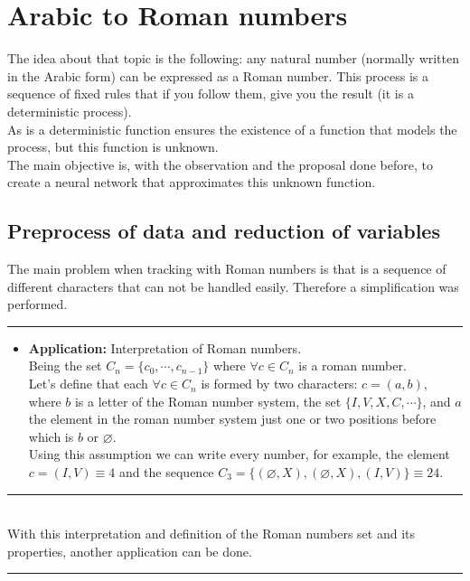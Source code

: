 \documentclass[a4paper, 11pt]{article}
\begin{document}
\section{Arabic to Roman numbers}
The idea about that topic is the following: any natural number (normally written in the Arabic form) can be expressed as a Roman number. This process is a sequence of fixed rules that if you follow them, give you the result (it is a deterministic process).\\
As is a deterministic function ensures the existence of a function that models the process, but this function is unknown.\\
The main objective is, with the observation and the proposal done before, to create a neural network that approximates this unknown function.

\subsection{Preprocess of data and reduction of variables}
The main problem when tracking with Roman numbers is that is a sequence of different characters that can not be handled easily. Therefore a simplification was performed.\\
\rule{\linewidth}{0.4pt}
    \begin{itemize}
        \item \textbf{Application:} Interpretation of Roman numbers.\\
 Being the set $C_n = \{c_0, \cdots, c_{n-1} \}$ where $\forall c \in C_n$ is a roman number.\\ 
 Let's define that each $\forall c \in C_n$ is formed by two characters: $c = (a,b)$, where $b$ is a letter of the Roman number system, the set $\{I, V, X, C, \cdots \}$, and $a$ the element in the roman number system just one or two positions before which is $b$ or $\varnothing$.\\
 Using this assumption we can write every number, for example, the element\\
        $c = (I,V) \equiv 4$ and the sequence $C_3 = \{ (\varnothing, X), (\varnothing, X), (I,V) \} \equiv 24$.
    \end{itemize}
\rule{\linewidth}{0.4pt}\\
With this interpretation and definition of the Roman numbers set and its properties, another application can be done.
\newpage
\hspace{-1.3em}\rule{\linewidth}{0.4pt}
\end{document}
